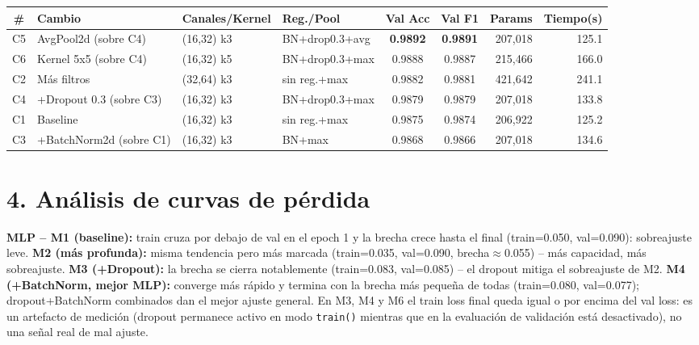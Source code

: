 \documentclass[9pt]{extarticle}
\begin{document}
\begin{center}
\begin{tabular}{@{}clllccrr@{}}
\toprule
\textbf{\#} & \textbf{Cambio} & \textbf{Canales/Kernel} & \textbf{Reg./Pool} & \textbf{Val Acc} & \textbf{Val F1} & \textbf{Params} & \textbf{Tiempo(s)} \\
\midrule
C5 & AvgPool2d (sobre C4) & (16,32) k3 & BN+drop0.3+avg & \textbf{0.9892} & \textbf{0.9891} & 207,018 & 125.1 \\
C6 & Kernel 5x5 (sobre C4) & (16,32) k5 & BN+drop0.3+max & 0.9888 & 0.9887 & 215,466 & 166.0 \\
C2 & Más filtros & (32,64) k3 & sin reg.+max & 0.9882 & 0.9881 & 421,642 & 241.1 \\
C4 & +Dropout 0.3 (sobre C3) & (16,32) k3 & BN+drop0.3+max & 0.9879 & 0.9879 & 207,018 & 133.8 \\
C1 & Baseline & (16,32) k3 & sin reg.+max & 0.9875 & 0.9874 & 206,922 & 125.2 \\
C3 & +BatchNorm2d (sobre C1) & (16,32) k3 & BN+max & 0.9868 & 0.9866 & 207,018 & 134.6 \\
\bottomrule
\end{tabular}
\end{center}

\section*{4. Análisis de curvas de pérdida}
\textbf{MLP -- M1 (baseline):} train cruza por debajo de val en el epoch 1 y la brecha crece hasta el final (train=0.050, val=0.090): sobreajuste leve. \textbf{M2 (más profunda):} misma tendencia pero más marcada (train=0.035, val=0.090, brecha$\approx$0.055) -- más capacidad, más sobreajuste. \textbf{M3 (+Dropout):} la brecha se cierra notablemente (train=0.083, val=0.085) -- el dropout mitiga el sobreajuste de M2. \textbf{M4 (+BatchNorm, mejor MLP):} converge más rápido y termina con la brecha más pequeña de todas (train=0.080, val=0.077); dropout+BatchNorm combinados dan el mejor ajuste general. En M3, M4 y M6 el train loss final queda igual o por encima del val loss: es un artefacto de medición (dropout permanece activo en modo \texttt{train()} mientras que en la evaluación de validación está desactivado), no una señal real de mal ajuste.
\end{document}
